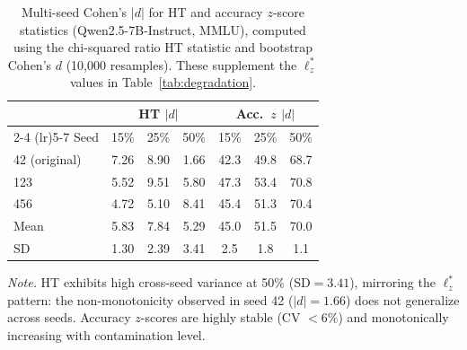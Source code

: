 \begin{table}[ht!]
\centering
\caption{Multi-seed Cohen's $|d|$ for HT and accuracy $z$-score statistics (Qwen2.5-7B-Instruct, MMLU), computed using the chi-squared ratio HT statistic and bootstrap Cohen's $d$ (10{,}000 resamples). These supplement the $\ell_z^*$ values in Table~\ref{tab:degradation}.}
\label{tab:ht_acc_multiseed}
\footnotesize
\begin{tabular}{@{}lcccccc@{}}
\toprule
& \multicolumn{3}{c}{HT $|d|$} & \multicolumn{3}{c}{Acc.\ $z$ $|d|$} \\
\cmidrule(lr){2-4} \cmidrule(lr){5-7}
Seed & 15\% & 25\% & 50\% & 15\% & 25\% & 50\% \\
\midrule
42 (original) & 7.26 & 8.90 & 1.66 & 42.3 & 49.8 & 68.7 \\
123 & 5.52 & 9.51 & 5.80 & 47.3 & 53.4 & 70.8 \\
456 & 4.72 & 5.10 & 8.41 & 45.4 & 51.3 & 70.4 \\
\addlinespace
Mean & 5.83 & 7.84 & 5.29 & 45.0 & 51.5 & 70.0 \\
SD & 1.30 & 2.39 & 3.41 & 2.5 & 1.8 & 1.1 \\
\bottomrule
\end{tabular}
\vspace{0.5em}

\noindent\textit{Note.} HT exhibits high cross-seed variance at 50\% (SD${=}3.41$), mirroring the $\ell_z^*$ pattern: the non-monotonicity observed in seed 42 ($|d|{=}1.66$) does not generalize across seeds. Accuracy $z$-scores are highly stable (CV $< 6\%$) and monotonically increasing with contamination level.
\end{table}

